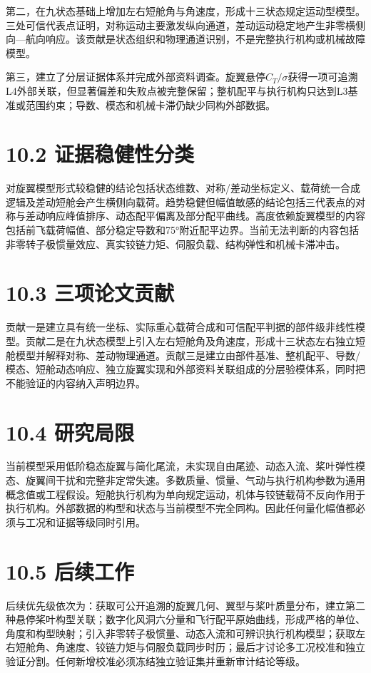 \documentclass[UTF8,12pt,openany]{ctexbook}
\begin{document}
第二，在九状态基础上增加左右短舱角与角速度，形成十三状态规定运动型模型。三处可信代表点证明，对称运动主要激发纵向通道，差动运动稳定地产生非零横侧向—航向响应。该贡献是状态组织和物理通道识别，不是完整执行机构或机械故障模型。

第三，建立了分层证据体系并完成外部资料调查。旋翼悬停$C_T/\sigma$获得一项可追溯L4外部关联，但显著偏差和失败点被完整保留；整机配平与执行机构只达到L3基准或范围约束；导数、模态和机械卡滞仍缺少同构外部数据。

\section{10.2 证据稳健性分类}

对旋翼模型形式较稳健的结论包括状态维数、对称/差动坐标定义、载荷统一合成逻辑及差动短舱会产生横侧向载荷。趋势稳健但幅值敏感的结论包括三代表点的对称与差动响应峰值排序、动态配平偏离及部分配平曲线。高度依赖旋翼模型的内容包括前飞载荷幅值、部分稳定导数和75°附近配平边界。当前无法判断的内容包括非零转子极惯量效应、真实铰链力矩、伺服负载、结构弹性和机械卡滞冲击。

\section{10.3 三项论文贡献}

贡献一是建立具有统一坐标、实际重心载荷合成和可信配平判据的部件级非线性模型。贡献二是在九状态模型上引入左右短舱角及角速度，形成十三状态左右独立短舱模型并解释对称、差动物理通道。贡献三是建立由部件基准、整机配平、导数/模态、短舱动态响应、独立旋翼实现和外部资料关联组成的分层验模体系，同时把不能验证的内容纳入声明边界。

\section{10.4 研究局限}

当前模型采用低阶稳态旋翼与简化尾流，未实现自由尾迹、动态入流、桨叶弹性模态、旋翼间干扰和完整非定常失速。多数质量、惯量、气动与执行机构参数为通用概念值或工程假设。短舱执行机构为单向规定运动，机体与铰链载荷不反向作用于执行机构。外部数据的构型和状态与当前模型不完全同构。因此任何量化幅值都必须与工况和证据等级同时引用。

\section{10.5 后续工作}

后续优先级依次为：获取可公开追溯的旋翼几何、翼型与桨叶质量分布，建立第二种悬停桨叶构型关联；数字化风洞六分量和飞行配平原始曲线，形成严格的单位、角度和构型映射；引入非零转子极惯量、动态入流和可辨识执行机构模型；获取左右短舱角、角速度、铰链力矩与伺服负载同步时历；最后才讨论多工况校准和独立验证分割。任何新增校准必须冻结独立验证集并重新审计结论等级。
\end{document}
